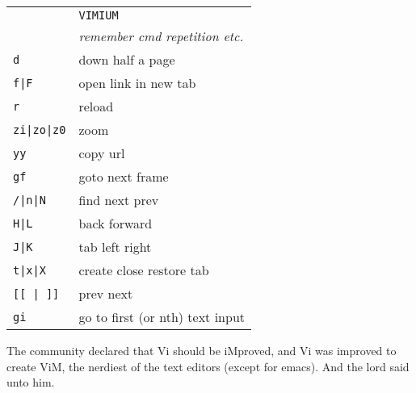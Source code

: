 \begin{tabular}{ll}
\\
&\texttt{VIMIUM}\\
&\emph{remember cmd repetition etc.}\\
\texttt{d}&down half a page\\
\texttt{f|F}&open link \textbar{} in new tab\\
\texttt{r}&reload\\
\texttt{zi|zo|z0}&zoom\\
\texttt{yy}&copy url\\
\texttt{gf}&goto next frame\\
\texttt{/|n|N}&find \textbar{} next \textbar{} prev\\
\texttt{H|L}&back \textbar{} forward\\
\texttt{J|K}&tab left \textbar{} right\\
\texttt{t|x|X}&create \textbar{} close \textbar{} restore tab\\
\texttt{[[ | ]]}&prev \textbar{} next\\
\texttt{gi}&go to first (or nth) text input\\
\end{tabular}
\vfill
\columnbreak
The community declared that Vi should be iMproved, and Vi was improved to
create ViM, the nerdiest of the text editors (except for emacs). And the lord
said unto him.
\vfill
